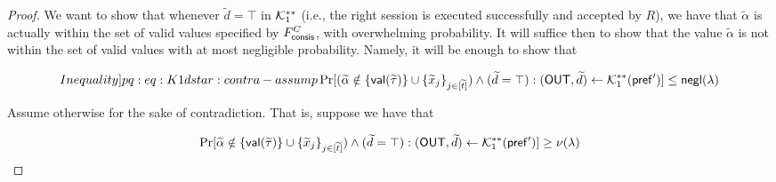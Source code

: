 \begin{proof}
We want to show that whenever $\tilde{d} = \top$ in $\mathcal{K}_1^{**}$ (i.e., the right session is executed successfully and accepted by $R$), we have that $\tilde{\alpha}$ is actually within the set of valid values specified by $F^C_\mathsf{consis}$, with overwhelming probability. It will suffice then to show that the value $\tilde{\alpha}$ is not within the set of valid values with at most negligible probability. Namely, it will be enough to show that 

\begin{equation}\label[Inequality]{pq:eq:K1dstar:contra-assump}
    \Pr[(\tilde{\alpha} \notin \Set{\msf{val}(\tilde{\tau})} \cup \Set{\tilde{x}_j}_{j \in [\tilde{t}]}) \wedge (\tilde{d} = \top): (\OUT,\tilde{d}) \gets \mcal{K}_1^{**}(\msf{pref'})] \leq \negl(\secpar)
\end{equation}

Assume otherwise for the sake of contradiction. That is, suppose we have that 

$$\Pr[\widetilde{\alpha} \notin \{\mathsf{val}(\widetilde{\tau})\} \cup \{\widetilde{x}_j\}_{j \in [\widetilde{t}]}) \wedge (\widetilde{d} = \top): (\mathsf{OUT},\widetilde{d}) \gets \mathcal{K}_1^{**}(\mathsf{pref'})] \geq \nu(\lambda)$$


\end{proof}
